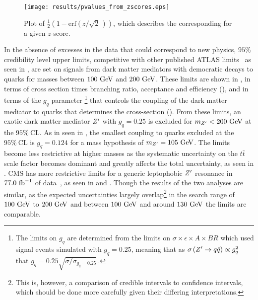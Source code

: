 \begin{figure}[htbp]
 \centering
 \texttt{[image: results/pvalues\_from\_zscores.eps]}
 \caption[Plot of \pvalue{} as a function of $z$-score.]{%
  Plot of $\frac{1}{2}\left(1 - \mathrm{erf}\left(z/\sqrt{2}\,\right)\right)$, which describes the corresponding \pvalue{} for a given $z$-score.}\label{fig:pvalues_from_zscores}
\end{figure}

In the absence of excesses in the data that could correspond to new physics, $95\%$ credibility level upper limits, competitive with other published ATLAS limits~\cite{EXOT-2017-32} as seen in , are set on signals from dark matter mediators with democratic decays to quarks for masses between $100~\mathrm{GeV}$ and $200~\mathrm{GeV}$.
These limits are shown in , in terms of cross section times branching ratio, acceptance and efficiency (), and in terms of the $g_{q}$ parameter%
\footnote{The limits on $g_{q}$ are determined from the limits on $\sigma \times \epsilon \times A \times BR$ which used signal events simulated with $g_{q} = 0.25$, meaning that as $\sigma\left(Z^{\prime} \to q\bar{q}\right) \propto g_{q}^{2}$ that $g_{q} = 0.25 \sqrt{\sigma/\sigma_{g_{q} = 0.25}}$\,.}
that controls the coupling of the \gls{dark matter mediator} to quarks that determines the cross-section ().
From these limits, an exotic dark matter mediator $Z^{\prime}$ with $g_{q}=0.25$ is excluded for $m_{Z^{\prime}} < 200~\mathrm{GeV}$ at the $95\%~\mathrm{CL}$.
As in seen in , the smallest coupling to quarks excluded at the $95\%~\mathrm{CL}$ is $g_{q} = 0.124$ for a mass hypothesis of $m_{Z^{\prime}} = 105~\mathrm{GeV}$.
The limits become less restrictive at higher masses as the systematic uncertainty on the $t\bar{t}$ scale factor becomes dominant and greatly affects the total uncertainty, as seen in .
CMS has more restrictive limits for a generic leptophobic $Z^{\prime}$ resonance in $77.0~\mathrm{fb}^{-1}$ of data~\cite{CMS:2019hlx}, as seen in  and .
Though the results of the two analyses are similar, as the expected uncertainties largely overlap\footnote{%
 This is, however, a comparison of credible intervals to confidence intervals, which should be done more carefully given their differing interpretations.}
in the search range of $100~\mathrm{GeV}$ to $200~\mathrm{GeV}$ and between $100~\mathrm{GeV}$ and around $130~\mathrm{GeV}$ the limits are comparable.

